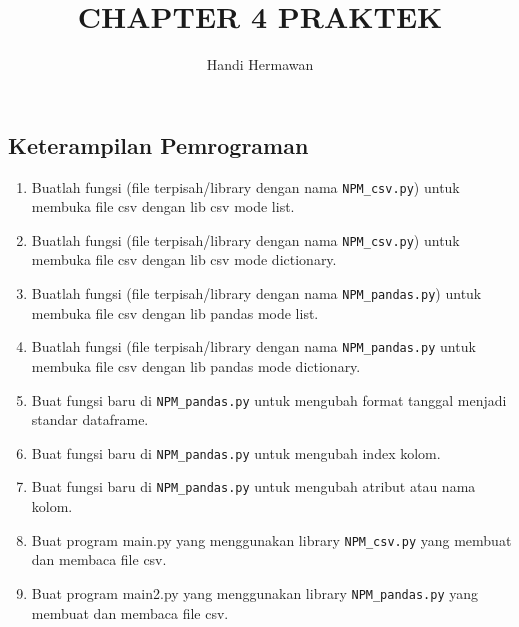 \title{CHAPTER 4 PRAKTEK}
\author{Handi Hermawan }
\subsection{Keterampilan Pemrograman}
\begin{enumerate}
    \item Buatlah  fungsi  (file  terpisah/library  dengan  nama  \verb|NPM_csv.py|)  untuk  membuka file csv dengan lib csv mode list.
    
   	

    \item Buatlah  fungsi  (file  terpisah/library  dengan  nama  \verb|NPM_csv.py|)  untuk  membuka file csv dengan lib csv mode dictionary.
   	
   	

	\item Buatlah fungsi (file terpisah/library dengan nama \verb|NPM_pandas.py|) untuk membuka file csv dengan lib pandas mode list.
	
	
		
	\item Buatlah fungsi (file terpisah/library dengan nama \verb|NPM_pandas.py| untuk membuka file csv dengan lib pandas mode dictionary.

	

	\item Buat fungsi baru di \verb|NPM_pandas.py| untuk mengubah format tanggal menjadi standar dataframe.

	

	\item Buat fungsi baru di \verb|NPM_pandas.py| untuk mengubah index kolom.
	
	
	
	\item Buat fungsi baru di \verb|NPM_pandas.py| untuk mengubah atribut atau nama kolom.
	
	
	
	\item Buat program main.py yang menggunakan library \verb|NPM_csv.py| yang membuat dan membaca file csv.
	
	
	
	\item Buat program main2.py yang menggunakan library \verb|NPM_pandas.py| yang membuat dan membaca file csv.


\end{enumerate} 

